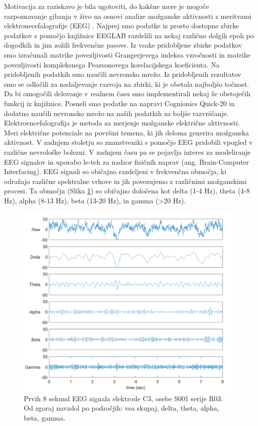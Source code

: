 \thispagestyle{fancy}
Motivacija za raziskavo je bila ugotoviti, do kakšne mere je mogoče razpoznavanje gibanja v živo na osnovi analize možganske aktivnosti z meritvami elektronecefalografije (EEG) . Najprej smo podatke iz prosto dostopne zbirke podatkov s pomočjo knjižnice EEGLAB razdelili na nekaj različno dolgih epoh po dogodkih in jim zožili frekvenčne pasove. Iz vsake pridobljene zbirke podatkov smo izračunali matrike povezljivosti Grangerjevega indeksa vzročnosti in matrike povezljivosti kompleksnega Pearsonovega korelacijskega koeficienta. Na pridobljenih podatkih smo naučili nevronsko mrežo. Iz pridobljenih rezultatov smo se odločili za nadaljevanje razvoja na zbirki, ki je obetala najboljšo točnost. Da bi omogočili delovanje v realnem času smo implementirali nekaj že obstoječih funkcij iz knjižnice. Posneli smo podatke na napravi Cognionics Quick-20 in dodatno naučili nevronsko mrežo na naših podatkih za boljše razvrščanje.
\newpage
{}
Elektroencefalografija je metoda za merjenje možganske električne aktivnosti. Meri električne potenciale na površini temena, ki jih deloma generira možganska aktivnost. V zadnjem stoletju so znanstveniki s pomočjo EEG pridobili vpogled v različne nevrološke bolezni. V zadnjem času pa se pojavlja interes za modeliranje EEG signalov in uporabo le-teh za nadzor fizičnih naprav (ang. Brain-Computer Interfacing). EEG signali so običajno razdeljeni v frekvenčna območja, ki odražajo različne spektralne vrhove in jih povezujemo z različnimi možganskimi procesi. Ta območja (Slika \ref{slika:eeg}) so običajno določena kot delta (1-4 Hz), theta (4-8 Hz), alpha (8-13 Hz), beta (13-20 Hz), in gamma (>20 Hz).
 \cite{nunezElectroencephalographyEEGNeurophysics2016}
 \begin{figure}[h]
    \begin{center}
    \includegraphics[width=1\linewidth]{slike/EEGSignals.png}
    \end{center}
    \caption[Frekvenčna območja EEG signala.]{Prvih 8 sekund EEG signala elektrode C3, osebe S001 serije R03. Od zgoraj navzdol po področjih: vsa skupaj, delta, theta, alpha, beta, gamma.}
    \label{slika:eeg}
    \end{figure}


